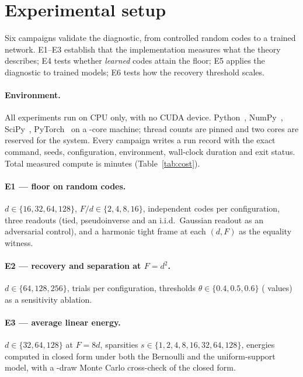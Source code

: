 \section{Experimental setup}
\label{sec:setup}

Six campaigns validate the diagnostic, from controlled random codes to a trained network.
E1--E3 establish that the implementation measures what the theory describes; E4 tests whether
\emph{learned} codes attain the floor; E5 applies the diagnostic to trained models; E6 tests
how the recovery threshold scales.

\paragraph{Environment.} All experiments run on CPU only, with no CUDA device.
Python~\EnvPython, NumPy~\EnvNumpy, SciPy~\EnvScipy, PyTorch~\EnvTorch{} on a
\EnvCpuCount-core machine; thread counts are pinned and two cores are reserved for the system.
Every campaign writes a run record with the exact command, seeds, configuration, environment,
wall-clock duration and exit status. Total measured compute is \DurTotalMin{} minutes
(Table~\ref{tab:cost}).

\paragraph{E1 --- floor on random codes.} $d\in\{16,32,64,128\}$, $F/d\in\{2,4,8,16\}$,
\EoneTrials{} independent codes per configuration, three readouts (tied, pseudoinverse and an
i.i.d.\ Gaussian readout as an adversarial control), and a harmonic tight frame at each
$(d,F)$ as the equality witness.

\paragraph{E2 --- recovery and separation at $F=d^2$.} $d\in\{64,128,256\}$,
\EtwoTrials{} trials per configuration, thresholds
$\theta\in\{0.4,0.5,0.6\}$ (\EtwoThetaCount{} values) as a sensitivity ablation.

\paragraph{E3 --- average linear energy.} $d\in\{32,64,128\}$ at $F=8d$, sparsities
$s\in\{1,2,4,8,16,32,64,128\}$, energies computed in closed form under both the Bernoulli and
the uniform-support model, with a \EthreeMcTrials-draw Monte Carlo cross-check of the closed
form.

